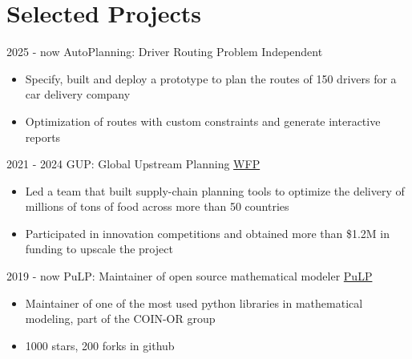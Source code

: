 \documentclass[letterpaper]{twentysecondcv} %
\begin{document}
\section{Selected Projects}
\begin{twenty}
  \twentyitem
      {2025 - now}
    {}
        {AutoPlanning: Driver Routing Problem}
        {Independent}
        {}
        {
        {\begin{itemize}
        \item Specify, built and deploy a prototype to plan the routes of 150 drivers for a car delivery company
        \item Optimization of routes with custom constraints and generate interactive reports
        \vspace{2mm}
        \end{itemize}}
        }
  \twentyitem
      {2021 - 2024}
    {}
        {GUP: Global Upstream Planning}
        {\href{https://www.wfp.org/}{WFP}}
        {}
        {
        {\begin{itemize}
        \item Led a team that built supply-chain planning tools to optimize the delivery of millions of tons of food across more than 50 countries
        \item Participated in innovation competitions and obtained more than \$1.2M in funding to upscale the project
        \vspace{2mm}
        \end{itemize}}
        }
  \twentyitem
      {2019 - now}
    {}
        {PuLP: Maintainer of open source mathematical modeler}
        {\href{https://github.com/coin-or/pulp}{PuLP}}
        {}
        {
        {\begin{itemize}
        \item Maintainer of one of the most used python libraries in mathematical modeling, part of the COIN-OR group
        \item 1000 stars, 200 forks in github
        \vspace{2mm}
        \end{itemize}}
        }

\end{twenty}
\end{document}

